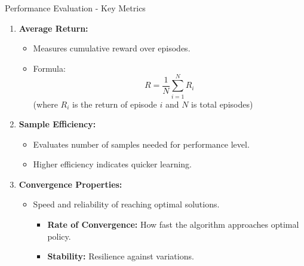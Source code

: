 \documentclass[aspectratio=169]{beamer}
\begin{document}
\begin{frame}[fragile]{Performance Evaluation - Key Metrics}
    \begin{enumerate}
        \item \textbf{Average Return:}
        \begin{itemize}
            \item Measures cumulative reward over episodes.
            \item Formula:  
            \begin{equation}
                R = \frac{1}{N} \sum_{i=1}^{N} R_i  
            \end{equation}
            (where \( R_i \) is the return of episode \( i \) and \( N \) is total episodes)
        \end{itemize}

        \item \textbf{Sample Efficiency:}
        \begin{itemize}
            \item Evaluates number of samples needed for performance level.
            \item Higher efficiency indicates quicker learning.
        \end{itemize}

        \item \textbf{Convergence Properties:}
        \begin{itemize}
            \item Speed and reliability of reaching optimal solutions.
            \begin{itemize}
                \item \textbf{Rate of Convergence:} How fast the algorithm approaches optimal policy.
                \item \textbf{Stability:} Resilience against variations.
            \end{itemize}
        \end{itemize}
    \end{enumerate}
\end{frame}
\end{document}
